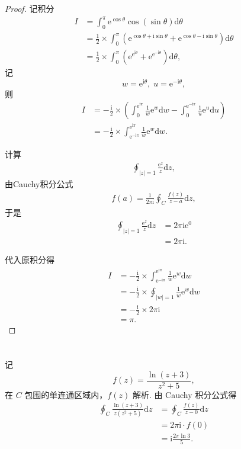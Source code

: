 \documentclass[12pt]{article}
\newcommand{\de}[1]{\mathrm{d}#1}
\newcommand{\mrm}[1]{\mathrm{#1}}
\newcommand{\kh}[1]{\left(#1\right)}
\begin{document}
\section{}
\begin{proof}
记积分
\begin{align*}
    I&=\int_0^\pi \mrm e^{\cos\theta}\cos\kh{\sin\theta}\de \theta\\
    &=\frac{1}{2}\times\int_0^\pi \kh{\mrm e^{\cos \theta+\mrm i\sin \theta}+\mrm e^{\cos \theta-\mrm i\sin \theta}}\de \theta\\
    &=\frac{1}{2}\times\int_0^\pi \kh{\mrm e^{\mrm e^{\mrm i\theta}}+\mrm e^{\mrm e^{-\mrm i\theta}}}\de \theta,
\end{align*}
记\[w=\mrm e^{\mrm i \theta},\; u=\mrm e^{-\mrm i\theta},\]
则
\begin{align*}
    I&=-\frac{\mrm i}{2}\times \kh{\int_0^{\mrm e^{\mrm i\pi}}\frac{1}{w}\mrm e^w\de w-\int_0^{\mrm e^{-\mrm i\pi}}\frac{1}{u}\mrm e^u\de u}\\
    &=-\frac{\mrm i}{2}\times \int_{\mrm e^{-\mrm i\pi}}^{\mrm e^{\mrm i\pi}}\frac{1}{w}\mrm e^w\de w.
\end{align*}

计算
\begin{align*}
    \oint_{|z|=1}\frac{\mrm e^z}{z}\de z,
\end{align*}
由Cauchy积分公式
\begin{align*}
    f\kh{a}=\frac{1}{2\pi \mrm i}\oint_C \frac{f\kh{z}}{z-a}\de z,
\end{align*}
于是
\begin{align*}
    \oint_{|z|=1}\frac{\mrm e^z}{z}\de z&=2\pi \mrm i \mrm e^0\\
    &=2\pi \mrm i.
\end{align*}

代入原积分得
\begin{align*}
    I&=-\frac{\mrm i}{2}\times \int_{\mrm e^{-\mrm i\pi}}^{\mrm e^{\mrm i\pi}}\frac{1}{w}\mrm e^w\de w\\
    &=-\frac{\mrm i}{2}\times \oint_{|w|=1}\frac{1}{w}\mrm e^w\de w\\
    &=-\frac{\mrm i}{2}\times 2\pi \mrm i\\
    &=\pi.
\end{align*}
\end{proof}
\section{}
\subsection{}
记
\[
f(z) = \frac{\ln(z+3)}{z^2+5},
\]
在 $C$ 包围的单连通区域内，$f(z)$ 解析. 由 Cauchy 积分公式得
\begin{align*}
\oint_C \frac{\ln(z+3)}{z(z^2+5)} \mathrm{d}z &= \oint_C \frac{f(z)}{z-0} \mathrm{d}z \\
&= 2\pi\mathrm{i} \cdot f(0) \\
&= \mathrm{i} \frac{2\pi\ln 3}{5}.
\end{align*}
\end{document}
